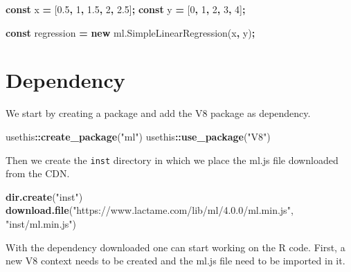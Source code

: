 \documentclass[
]{krantz}
\makeatletter
\newenvironment{Shaded}{\begin{snugshade}}{\end{snugshade}}
\newcommand{\AttributeTok}[1]{\textcolor[rgb]{0.61,0.61,0.61}{#1}}
\newcommand{\DecValTok}[1]{\textcolor[rgb]{0.06,0.06,0.06}{#1}}
\newcommand{\FloatTok}[1]{\textcolor[rgb]{0.06,0.06,0.06}{#1}}
\newcommand{\KeywordTok}[1]{\textcolor[rgb]{0.27,0.27,0.27}{\textbf{#1}}}
\newcommand{\NormalTok}[1]{#1}
\newcommand{\OperatorTok}[1]{\textcolor[rgb]{0.43,0.43,0.43}{\textbf{#1}}}
\newcommand{\StringTok}[1]{\textcolor[rgb]{0.5,0.5,0.5}{#1}}
\newcommand{\VariableTok}[1]{\textcolor[rgb]{0,0,0}{#1}}
\newenvironment{kframe}{%
\medskip{}
\setlength{\fboxsep}{.8em}
 \def\at@end@of@kframe{}%
 \ifinner\ifhmode%
  \def\at@end@of@kframe{\end{minipage}}%
  \begin{minipage}{\columnwidth}%
 \fi\fi%
 \def\FrameCommand##1{\hskip\@totalleftmargin \hskip-\fboxsep
 \colorbox{shadecolor}{##1}\hskip-\fboxsep
     \hskip-\linewidth \hskip-\@totalleftmargin \hskip\columnwidth}%
 \MakeFramed {\advance\hsize-\width
   \@totalleftmargin\z@ \linewidth\hsize
   \@setminipage}}%
 {\par\unskip\endMakeFramed%
 \at@end@of@kframe}
\renewenvironment{Shaded}{\begin{kframe}}{\end{kframe}}
\makeatother
\begin{document}
\begin{Shaded}
\begin{Highlighting}[]
\KeywordTok{const}\NormalTok{ x }\OperatorTok{=}\NormalTok{ [}\FloatTok{0.5}\OperatorTok{,} \DecValTok{1}\OperatorTok{,} \FloatTok{1.5}\OperatorTok{,} \DecValTok{2}\OperatorTok{,} \FloatTok{2.5}\NormalTok{]}\OperatorTok{;}
\KeywordTok{const}\NormalTok{ y }\OperatorTok{=}\NormalTok{ [}\DecValTok{0}\OperatorTok{,} \DecValTok{1}\OperatorTok{,} \DecValTok{2}\OperatorTok{,} \DecValTok{3}\OperatorTok{,} \DecValTok{4}\NormalTok{]}\OperatorTok{;}

\KeywordTok{const}\NormalTok{ regression }\OperatorTok{=} \KeywordTok{new} \VariableTok{ml}\NormalTok{.}\AttributeTok{SimpleLinearRegression}\NormalTok{(x}\OperatorTok{,}\NormalTok{ y)}\OperatorTok{;}
\end{Highlighting}
\end{Shaded}

\hypertarget{dependency}{%
\section{Dependency}\label{dependency}}

We start by creating a package and add the V8 package as dependency.

\begin{Shaded}
\begin{Highlighting}[]
\NormalTok{usethis}\OperatorTok{::}\KeywordTok{create\_package}\NormalTok{(}\StringTok{"ml"}\NormalTok{)}
\NormalTok{usethis}\OperatorTok{::}\KeywordTok{use\_package}\NormalTok{(}\StringTok{"V8"}\NormalTok{)}
\end{Highlighting}
\end{Shaded}

Then we create the \texttt{inst} directory in which we place the ml.js file downloaded from the CDN.

\begin{Shaded}
\begin{Highlighting}[]
\KeywordTok{dir.create}\NormalTok{(}\StringTok{"inst"}\NormalTok{)}
\KeywordTok{download.file}\NormalTok{(}\StringTok{"https://www.lactame.com/lib/ml/4.0.0/ml.min.js"}\NormalTok{, }\StringTok{"inst/ml.min.js"}\NormalTok{)}
\end{Highlighting}
\end{Shaded}

With the dependency downloaded one can start working on the R code. First, a new V8 context needs to be created and the ml.js file need to be imported in it.
\end{document}
